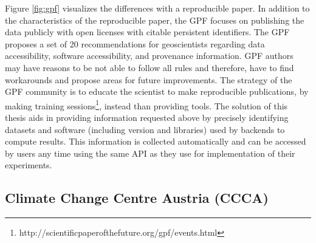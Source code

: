 \documentclass[draft,final]{vutinfth} %
\begin{document}
Figure \ref{fig:gpf} visualizes the differences with a reproducible paper. In addition to the characteristics of the reproducible paper, the GPF focuses on publishing the data publicly with open licenses with citable persistent identifiers.
The GPF proposes a set of 20 recommendations for geoscientists regarding data accessibility, software accessibility, and provenance information. GPF authors may have reasons to be not able to follow all rules and therefore, have to find workarounds and propose areas for future improvements. The strategy of the GPF community is to educate the scientist to make reproducible publications, by making training sessions\footnote{http://scientificpaperofthefuture.org/gpf/events.html}, instead than providing tools. The solution of this thesis aids in providing information requested above by precisely identifying datasets and software (including version and libraries) used by backends to compute results. This information is collected automatically and can be accessed by users any time using the same API as they use for implementation of their experiments.  
\subsection{Climate Change Centre Austria (CCCA)}
\end{document}
